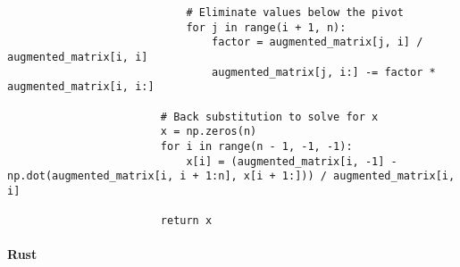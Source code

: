 \documentclass{article}
\begin{document}
\begin{verbatim}
                            # Eliminate values below the pivot
                            for j in range(i + 1, n):
                                factor = augmented_matrix[j, i] / augmented_matrix[i, i]
                                augmented_matrix[j, i:] -= factor * augmented_matrix[i, i:]

                        # Back substitution to solve for x
                        x = np.zeros(n)
                        for i in range(n - 1, -1, -1):
                            x[i] = (augmented_matrix[i, -1] - np.dot(augmented_matrix[i, i + 1:n], x[i + 1:])) / augmented_matrix[i, i]

                        return x
                \end{verbatim}
            \paragraph{Rust}
\end{document}
